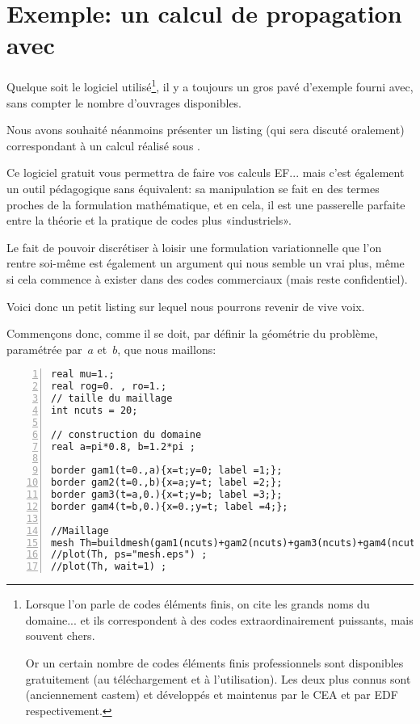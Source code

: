 \section{Exemple: un calcul de propagation avec \freefem}

\medskip
Quelque soit le logiciel utilisé\footnote{%
Lorsque l'on parle de codes éléments finis, on cite les grands noms du domaine... et ils correspondent à des
codes extraordinairement puissants, mais souvent chers.

Or un certain nombre de codes éléments finis professionnels sont disponibles gratuitement (au téléchargement
et à l'utilisation).
Les deux plus connus sont \castem (anciennement castem) et \aster développés et maintenus
par le CEA et par EDF respectivement.%
}, il y a toujours un gros pavé d'exemple fourni avec,
sans compter le nombre d'ouvrages disponibles.

\medskip
Nous avons souhaité néanmoins présenter un listing (qui sera discuté oralement)
correspondant à un calcul réalisé sous \freefem.

Ce logiciel gratuit vous permettra de faire vos calculs EF... mais c'est également un outil 
pédagogique sans équivalent: sa manipulation se fait en des termes proches de la
formulation mathématique, et en cela, il est une passerelle parfaite entre la théorie
et la pratique de codes plus «industriels».

Le fait de pouvoir discrétiser à loisir une formulation variationnelle que l'on rentre
soi-même est également un argument qui nous semble un vrai plus, même si
cela commence à exister dans des codes commerciaux (mais reste confidentiel).

\medskip
Voici donc un petit listing sur lequel nous pourrons revenir de vive voix.

Commençons donc, comme il se doit, par définir la géométrie du problème, paramétrée
par~$a$ et~$b$, que nous maillons:

\medskip
\color{gris}\scriptsize
\begin{Verbatim}[numbers=left,numbersep=3pt]
real mu=1.; 
real rog=0. , ro=1.;
// taille du maillage
int ncuts = 20;

// construction du domaine
real a=pi*0.8, b=1.2*pi ; 

border gam1(t=0.,a){x=t;y=0; label =1;};
border gam2(t=0.,b){x=a;y=t; label =2;};
border gam3(t=a,0.){x=t;y=b; label =3;};
border gam4(t=b,0.){x=0.;y=t; label =4;};

//Maillage
mesh Th=buildmesh(gam1(ncuts)+gam2(ncuts)+gam3(ncuts)+gam4(ncuts)); 
//plot(Th, ps="mesh.eps") ;
//plot(Th, wait=1) ;
\end{Verbatim}
\color{black}\normalsize

